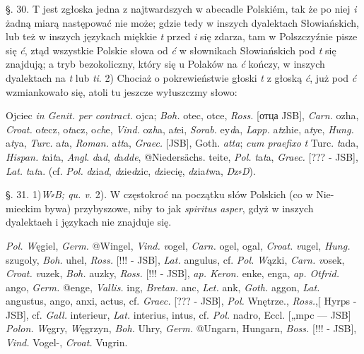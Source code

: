 §. 30.
T jest zgłoska jedna z najtwardszych w abecadle Polskiém,
tak że po niej \textit{i} żadną miarą następować nie może; gdzie
tedy w inszych dyalektach Słowiańskich, lub też w inszych
językach miękkie \textit{t} przed \textit{i} się zdarza, tam w Polszczyźnie
pisze się \textit{ć}, ztąd wszystkie Polskie słowa od \textit{ć} w słownikach
Słowiańskich pod \textit{t} się znajdują; a tryb bezokoliczny, który
się u Polaków na \textit{ć} kończy, w inszych dyalektach na \textit{t} lub \textit{ti}.
2) Chociaż o pokrewieństwie głoski \textit{t} z głoską \textit{ć}, już
pod \textit{ć} wzmiankowało się, atoli tu jeszcze wyłuszczmy słowo:

Ojciec \textit{in Genit. per contract.} ojca; \textit{Boh.} otec, otce, \textit{Ross.} [отца JSB], \textit{Carn.} ozha, \textit{Croat.} o\textit{t}ecz, o\textit{t}acz, o\textit{ch}e, \textit{Vind.} oz\textit{h}a,
a\textit{t}ei, \textit{Sorab.} ey\textit{d}a, \textit{Lapp.} a\textit{t}zhie, a\textit{t}ye, \textit{Hung.} a\textit{t}ya, \textit{Turc.} a\textit{t}a, \textit{Roman.} a\textit{tt}a, \textit{Graec.} [JSB], Goth. \textit{atta}; \textit{cum praefixo} \textit{t} Turc.
\textit{t}ada, \textit{Hispan.} \textit{t}ai\textit{t}a, \textit{Angl}. \textit{d}a\textit{d}, \textit{d}a\textit{dde}, @{Niedersächs. teite}, \textit{Pol.} \textit{t}a\textit{t}a, \textit{Graec.} [??? - JSB], \textit{Lat.} \textit{t}a\textit{t}a. (cf. \textit{Pol.} \textit{d}zia\textit{d}, \textit{d}zie\textit{d}zic, \textit{d}ziecię,
\textit{d}zia\textit{t}wa, \textit{D}z⸗\textit{D}).

§. 31.
1)\textit{W⸗B; qu. v.}
2). W częstokroć na początku słów Polskich (co w Nie-
mieckim bywa) przybyszowe, niby to jak \textit{spiritus asper},
gdyż w inszych dyalektaeh i językach nie znajduje się.

\textit{Pol.} \textit{W}ęgiel, \textit{Germ.} @{Wingel}, \textit{Vind.} \textit{v}ogel, \textit{Carn.} ogel, ogal, \textit{Croat.} \textit{v}ugel, \textit{Hung.} szugoly, \textit{Boh.} uhel, \textit{Ross.} [!!! - JSB],
\textit{Lat.} angulus, cf. \textit{Pol.} \textit{W}ązki, \textit{Carn.} \textit{v}osek, \textit{Croat.} \textit{v}uzek, \textit{Boh.} auzky, \textit{Ross.}  [!!! - JSB], \textit{ap. Keron.} enke, enga, \textit{ap. Otfrid.}
ango, \textit{Germ.} @{enge}, \textit{Vallis.} ing, \textit{Bretan.} anc, \textit{Let.} ank, \textit{Goth.} aggon, \textit{Lat.} angustus, ango, anxi, actus, cf. \textit{Graec.} [??? - JSB],
 \textit{Pol.} Wnętrze., \textit{Ross.},[ Hyrps - JSB], cf. \textit{Gall.} interieur, \textit{Lat.} interius, intus, cf. \textit{Pol.} nadro, Eccl. [„mpc --- JSB]
\textit{Polon.} \textit{W}ęgry, \textit{W}ęgrzyn, \textit{Boh.} Uhry, \textit{Germ.} @{Ungarn, Hungarn}, \textit{Boss.} [!!! - JSB], \textit{Vind.} Vogel-, \textit{Croat.} Vugrin.


